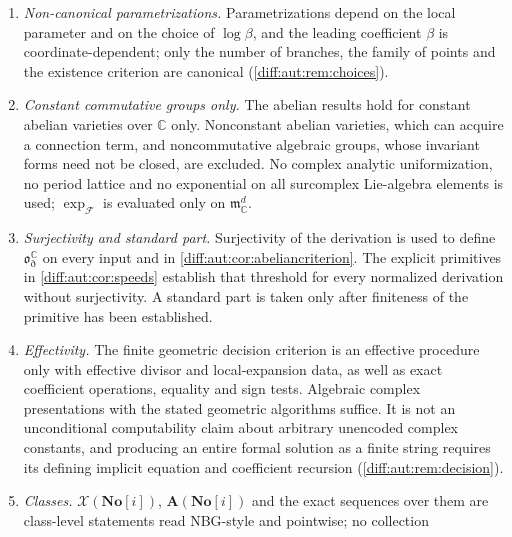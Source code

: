 \documentclass[11pt,letterpaper]{article}
\numberwithin{equation}{section}
\theoremstyle{definition}
\theoremstyle{remark}
\newcommand{\SC}{\mathbf{No}[i]}
\newcommand{\C}{\mathbb C}
\newcommand{\mm}{\mathfrak m}
\newcommand{\Obs}{\mathfrak o}
\newcommand{\Dn}{\eth}
\begin{document}
\begin{enumerate}[label=\textup{N\arabic*.},leftmargin=3.0em,itemsep=0.35em,start=80]
classical \cite[Lemma~6.1]{NPT}, Rosenlicht's algebraic-independence theorem is
imported \cite[Lemma~7.2, Proposition~7.3]{NPT}, and the curve-and-derivation
formalism is that of \cite{NPT}, whose numbered statements are cited from the
consulted arXiv version~1 and are not assumed to match the journal numbering. The
construction of surreal derivations, formal implicit equations, invariant
differentials and characteristic-zero formal-group logarithms are inputs, not
contributions; \cite{Milne} supplies the standard setting only, and the
formal-logarithm argument is proved in full (\cref{diff:aut:lem:formallog}).
\item \emph{Non-canonical parametrizations.} Parametrizations depend on the local
parameter and on the choice of $\log\beta$, and the leading coefficient $\beta$ is
coordinate-dependent; only the number of branches, the family of points and the
existence criterion are canonical (\cref{diff:aut:rem:choices}).
\item \emph{Constant commutative groups only.} The abelian results hold for
constant abelian varieties over $\C$ only. Nonconstant abelian varieties, which can
acquire a connection term, and noncommutative algebraic groups, whose invariant
forms need not be closed, are excluded. No complex analytic uniformization, no
period lattice and no exponential on all surcomplex Lie-algebra elements is
used; $\exp_{\mathcal F}$ is evaluated only on $\mm_{\C}^{d}$.
\item \emph{Surjectivity and standard part.} Surjectivity of the derivation is
used to define $\Obs^{\C}_{\Dn}$ on every input and in
\cref{diff:aut:cor:abeliancriterion}. The explicit primitives in
\cref{diff:aut:cor:speeds} establish that threshold for every
normalized derivation without surjectivity. A standard part is
taken only after finiteness of the primitive has been established.
\item \emph{Effectivity.} The finite geometric decision criterion is an effective
procedure only with effective divisor and local-expansion data, as well
as exact coefficient operations, equality and sign tests. Algebraic
complex presentations with the stated geometric algorithms suffice.
It is not an
unconditional computability claim about arbitrary unencoded complex constants,
and producing an entire formal solution as a finite string requires its
defining implicit equation and coefficient recursion
(\cref{diff:aut:rem:decision}).
\item \emph{Classes.} $\mathcal X(\SC)$, $\mathbf A(\SC)$ and the exact sequences
over them are class-level statements read NBG-style and pointwise; no collection

\end{enumerate}
\end{document}

